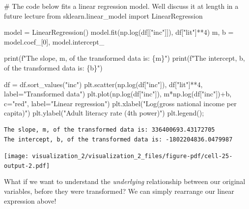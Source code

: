 \documentclass[
  letterpaper,
  DIV=11,
  numbers=noendperiod]{scrreprt}
\newenvironment{Shaded}{\begin{snugshade}}{\end{snugshade}}
\newcommand{\BuiltInTok}[1]{\textcolor[rgb]{0.00,0.23,0.31}{#1}}
\newcommand{\CommentTok}[1]{\textcolor[rgb]{0.37,0.37,0.37}{#1}}
\newcommand{\DecValTok}[1]{\textcolor[rgb]{0.68,0.00,0.00}{#1}}
\newcommand{\ImportTok}[1]{\textcolor[rgb]{0.00,0.46,0.62}{#1}}
\newcommand{\NormalTok}[1]{\textcolor[rgb]{0.00,0.23,0.31}{#1}}
\newcommand{\OperatorTok}[1]{\textcolor[rgb]{0.37,0.37,0.37}{#1}}
\newcommand{\SpecialCharTok}[1]{\textcolor[rgb]{0.37,0.37,0.37}{#1}}
\newcommand{\SpecialStringTok}[1]{\textcolor[rgb]{0.13,0.47,0.30}{#1}}
\newcommand{\StringTok}[1]{\textcolor[rgb]{0.13,0.47,0.30}{#1}}
\begin{document}
\begin{Shaded}
\begin{Highlighting}[]
\CommentTok{\# The code below fits a linear regression model. We\textquotesingle{}ll discuss it at length in a future lecture}
\ImportTok{from}\NormalTok{ sklearn.linear\_model }\ImportTok{import}\NormalTok{ LinearRegression}

\NormalTok{model }\OperatorTok{=}\NormalTok{ LinearRegression()}
\NormalTok{model.fit(np.log(df[[}\StringTok{"inc"}\NormalTok{]]), df[}\StringTok{"lit"}\NormalTok{]}\OperatorTok{**}\DecValTok{4}\NormalTok{)}
\NormalTok{m, b }\OperatorTok{=}\NormalTok{ model.coef\_[}\DecValTok{0}\NormalTok{], model.intercept\_}

\BuiltInTok{print}\NormalTok{(}\SpecialStringTok{f"The slope, m, of the transformed data is: }\SpecialCharTok{\{}\NormalTok{m}\SpecialCharTok{\}}\SpecialStringTok{"}\NormalTok{)}
\BuiltInTok{print}\NormalTok{(}\SpecialStringTok{f"The intercept, b, of the transformed data is: }\SpecialCharTok{\{}\NormalTok{b}\SpecialCharTok{\}}\SpecialStringTok{"}\NormalTok{)}

\NormalTok{df }\OperatorTok{=}\NormalTok{ df.sort\_values(}\StringTok{"inc"}\NormalTok{)}
\NormalTok{plt.scatter(np.log(df[}\StringTok{"inc"}\NormalTok{]), df[}\StringTok{"lit"}\NormalTok{]}\OperatorTok{**}\DecValTok{4}\NormalTok{, label}\OperatorTok{=}\StringTok{"Transformed data"}\NormalTok{)}
\NormalTok{plt.plot(np.log(df[}\StringTok{"inc"}\NormalTok{]), m}\OperatorTok{*}\NormalTok{np.log(df[}\StringTok{"inc"}\NormalTok{])}\OperatorTok{+}\NormalTok{b, c}\OperatorTok{=}\StringTok{"red"}\NormalTok{, label}\OperatorTok{=}\StringTok{"Linear regression"}\NormalTok{)}
\NormalTok{plt.xlabel(}\StringTok{"Log(gross national income per capita)"}\NormalTok{)}
\NormalTok{plt.ylabel(}\StringTok{"Adult literacy rate (4th power)"}\NormalTok{)}
\NormalTok{plt.legend()}\OperatorTok{;}
\end{Highlighting}
\end{Shaded}

\begin{verbatim}
The slope, m, of the transformed data is: 336400693.43172705
The intercept, b, of the transformed data is: -1802204836.0479987
\end{verbatim}

\texttt{[image: visualization\_2/visualization\_2\_files/figure-pdf/cell-25-output-2.pdf]}

What if we want to understand the \emph{underlying} relationship between
our original variables, before they were transformed? We can simply
rearrange our linear expression above!
\end{document}
